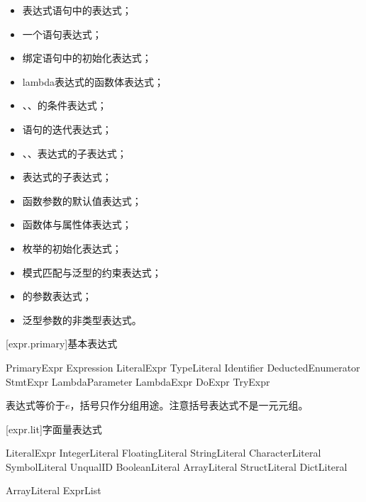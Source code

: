 \begin{itemize}
    \item 表达式语句中的表达式；
    \item 一个语句表达式；
    \item 绑定语句中的初始化表达式；
    \item lambda表达式的函数体表达式；
    \item {}、、的条件表达式；
    \item {}语句的迭代表达式；
    \item {}、、表达式的子表达式；
    \item {}表达式的子表达式；
    \item 函数参数的默认值表达式；
    \item 函数体与属性体表达式；
    \item 枚举的初始化表达式；
    \item 模式匹配与泛型的约束表达式；
    \item {}的参数表达式；
    \item 泛型参数的非类型表达式。
\end{itemize}

[expr.primary]{基本表达式}

\begin{bnf}{PrimaryExpr}
    \terminal{(} Expression \terminal{)} \br
    LiteralExpr \br
    TypeLiteral \br
    Identifier \br
    DeductedEnumerator \br
     \br
    \terminal{\$} \br
    StmtExpr \br
    LambdaParameter \br
    LambdaExpr \br
    DoExpr \br
    TryExpr
\end{bnf}

\pnum
表达式等价于$e$，括号只作分组用途。\enternote 注意括号表达式不是一元元组。\exitnote

[expr.lit]{字面量表达式}

\begin{bnf}{LiteralExpr}
    IntegerLiteral \br
    FloatingLiteral \br
    StringLiteral \br
    CharacterLiteral \br
    SymbolLiteral \br
     UnqualID \terminal{)} \br
    BooleanLiteral \br
     \br
    ArrayLiteral \br
    StructLiteral \br
    DictLiteral
\end{bnf}

\begin{bnf}{ArrayLiteral}
    \terminal{[} ExprList\bnfq \terminal{]}
\end{bnf}

